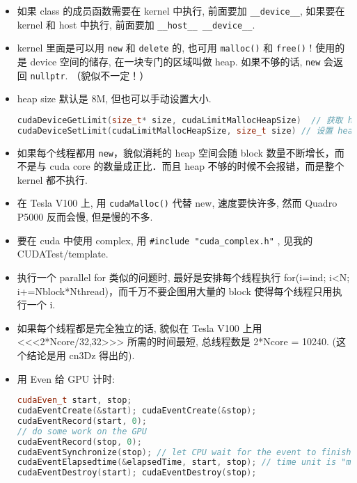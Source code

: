 \begin{itemize}
\item 如果 class 的成员函数需要在 kernel 中执行, 前面要加 \verb`__device__`, 如果要在 kernel 和 host 中执行, 前面要加 \verb`__host__ __device__`.
\item kernel 里面是可以用 \verb`new` 和 \verb`delete` 的, 也可用 \verb`malloc()` 和 \verb`free()` ! 使用的是 device 空间的储存, 在一块专门的区域叫做 heap. 如果不够的话, \verb`new` 会返回 \verb`nullptr`. （貌似不一定！）
\item heap size 默认是 8M, 但也可以手动设置大小.
\begin{lstlisting}[language=cpp]
cudaDeviceGetLimit(size_t* size, cudaLimitMallocHeapSize)  // 获取 heap size
cudaDeviceSetLimit(cudaLimitMallocHeapSize, size_t size) // 设置 heap size
\end{lstlisting}
\item 如果每个线程都用 \verb`new`，貌似消耗的 heap 空间会随 block 数量不断增长，而不是与 cuda core 的数量成正比．而且 heap 不够的时候不会报错，而是整个 kernel 都不执行.
\item 在 Tesla V100 上, 用 \verb`cudaMalloc()` 代替 new, 速度要快许多,  然而 Quadro P5000 反而会慢, 但是慢的不多.
\item 要在 cuda 中使用 complex, 用 \verb`#include "cuda_complex.h"` , 见我的 CUDATest/template.
\item 执行一个 parallel for 类似的问题时, 最好是安排每个线程执行 for(i=ind; i<N; i+=Nblock*Nthread)，而千万不要企图用大量的 block 使得每个线程只用执行一个 i.
\item 如果每个线程都是完全独立的话, 貌似在 Tesla V100 上用 <<<2*Ncore/32,32>>> 所需的时间最短, 总线程数是 2*Ncore = 10240. (这个结论是用 cn3Dz 得出的).
\item 用 Even 给 GPU 计时:
\begin{lstlisting}[language=cpp]
cudaEven_t start, stop;
cudaEventCreate(&start); cudaEventCreate(&stop);
cudaEventRecord(start, 0);
// do some work on the GPU
cudaEventRecord(stop, 0);
cudaEventSynchronize(stop); // let CPU wait for the event to finish
cudaEventElapsedtime(&elapsedTime, start, stop); // time unit is "ms"
cudaEventDestroy(start); cudaEventDestroy(stop);
\end{lstlisting}


\end{itemize}
